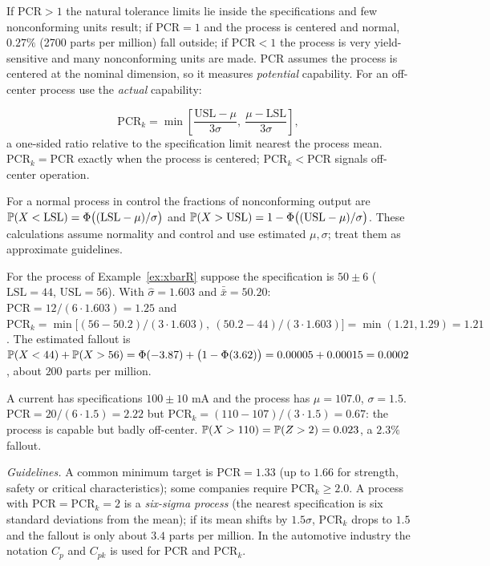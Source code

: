 If $\mathrm{PCR}>1$ the natural tolerance limits lie inside the specifications and few nonconforming units result; if $\mathrm{PCR}=1$ and the process is centered and normal, $0.27\%$ (2700 parts per million) fall outside; if $\mathrm{PCR}<1$ the process is very yield-sensitive and many nonconforming units are made. PCR assumes the process is centered at the nominal dimension, so it measures \emph{potential} capability. For an off-center process use the \emph{actual} capability:

\begin{definition}[PCR$_k$]
\[ \mathrm{PCR}_k=\min\left[\frac{\mathrm{USL}-\mu}{3\sigma},\ \frac{\mu-\mathrm{LSL}}{3\sigma}\right], \]
a one-sided ratio relative to the specification limit nearest the process mean. $\mathrm{PCR}_k=\mathrm{PCR}$ exactly when the process is centered; $\mathrm{PCR}_k<\mathrm{PCR}$ signals off-center operation.
\end{definition}

For a normal process in control the fractions of nonconforming output are $\mathbb{P}(X<\mathrm{LSL})=\Phi\big((\mathrm{LSL}-\mu)/\sigma\big)$ and $\mathbb{P}(X>\mathrm{USL})=1-\Phi\big((\mathrm{USL}-\mu)/\sigma\big)$. These calculations assume normality and control and use estimated $\mu,\sigma$; treat them as approximate guidelines.

\begin{example}
For the process of Example~\ref{ex:xbarR} suppose the specification is $50\pm6$ ($\mathrm{LSL}=44$, $\mathrm{USL}=56$). With $\hat\sigma=1.603$ and $\bar{\bar{x}}=50.20$: $\mathrm{PCR}=12/(6\cdot1.603)=1.25$ and $\mathrm{PCR}_k=\min\big[(56-50.2)/(3\cdot1.603),\ (50.2-44)/(3\cdot1.603)\big]=\min(1.21,1.29)=1.21$. The estimated fallout is $\mathbb{P}(X<44)+\mathbb{P}(X>56)=\Phi(-3.87)+\big(1-\Phi(3.62)\big)=0.00005+0.00015=0.0002$, about $200$ parts per million.
\end{example}

\begin{example}
A current has specifications $100\pm10$ mA and the process has $\mu=107.0$, $\sigma=1.5$. $\mathrm{PCR}=20/(6\cdot1.5)=2.22$ but $\mathrm{PCR}_k=(110-107)/(3\cdot1.5)=0.67$: the process is capable but badly off-center. $\mathbb{P}(X>110)=\mathbb{P}(Z>2)=0.023$, a $2.3\%$ fallout.
\end{example}

\emph{Guidelines.} A common minimum target is $\mathrm{PCR}=1.33$ (up to $1.66$ for strength, safety or critical characteristics); some companies require $\mathrm{PCR}_k\ge2.0$. A process with $\mathrm{PCR}=\mathrm{PCR}_k=2$ is a \emph{six-sigma process} (the nearest specification is six standard deviations from the mean); if its mean shifts by $1.5\sigma$, $\mathrm{PCR}_k$ drops to $1.5$ and the fallout is only about $3.4$ parts per million. In the automotive industry the notation $C_p$ and $C_{pk}$ is used for PCR and PCR$_k$.


